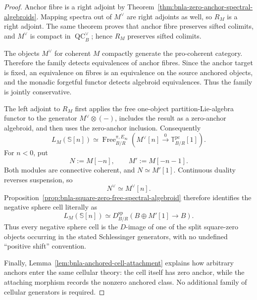 \begin{proof}
Anchor fibre is a right adjoint by
Theorem~\ref{thm:bnla-zero-anchor-spectral-algebroids}.  Mapping spectra out
of $M^\vee$ are right adjoints as well, so $R_M$ is a right adjoint.  The same
theorem proves that anchor fibre preserves sifted colimits, and $M^\vee$ is
compact in $\operatorname{QC}^{\vee}_B$; hence $R_M$ preserves sifted
colimits.

The objects $M^\vee$ for coherent $M$ compactly generate the pro-coherent
category.  Therefore the family detects equivalences of anchor fibres.  Since
the anchor target is fixed, an equivalence on fibres is an equivalence on the
source anchored objects, and the monadic forgetful functor detects
algebroid equivalences.  Thus the family is jointly conservative.

The left adjoint to $R_M$ first applies the free one-object
partition-Lie-algebra functor to the generator $M^\vee\otimes(-)$, includes
the result as a zero-anchor algebroid, and then uses the zero-anchor inclusion.
Consequently
\[
    L_M(\mathbb S[n])
    \simeq
    \operatorname{Free}^{\pi,E_\infty}_{B/R}
    \left(M^\vee[n]\xrightarrow{0}
    \mathbb T^{\mathrm{pc}}_{B/R}[1]\right).
\]
For $n<0$, put
\[
    N:=M[-n],
    \qquad
    M':=M[-n-1].
\]
Both modules are connective coherent, and $N\simeq M'[1]$.  Continuous
duality reverses suspension, so
\[
    N^\vee
    \simeq
    M^\vee[n].
\]
Proposition~\ref{prop:bnla-square-zero-free-spectral-algebroid} therefore
identifies the negative sphere cell literally as
\[
\boxed{
    L_M(\mathbb S[n])
    \simeq
    D^{\mathrm{sp}}_{B/R}
    \left(B\oplus M'[1]\longrightarrow B\right).}
\]
Thus every negative sphere cell is the $D$-image of one of the split
square-zero objects occurring in the stated Schlessinger generators, with no
undefined ``positive shift'' convention.

Finally, Lemma~\ref{lem:bnla-anchored-cell-attachment} explains how arbitrary
anchors enter the same cellular theory: the cell itself has zero anchor, while
the attaching morphism records the nonzero anchored class.  No additional
family of cellular generators is required.
\end{proof}

